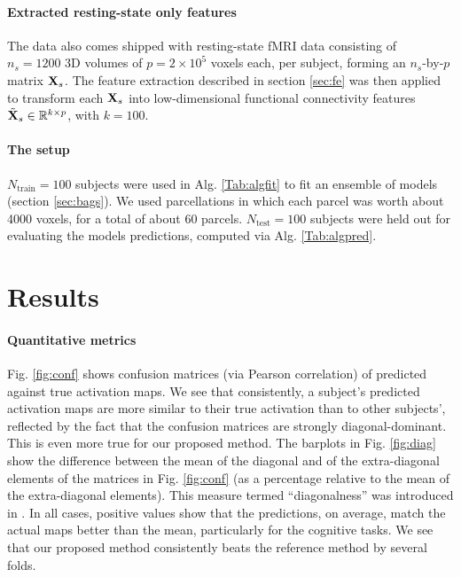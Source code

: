 \paragraph{Extracted resting-state only features}
The data also comes shipped with resting-state fMRI data consisting of $n_s = 1200$ 3D volumes
of $p = 2 \times 10^5$ voxels each, per subject, forming an $n_s$-by-$p$ matrix $\mathbf{X}_s$.
The feature extraction described in section \ref{sec:fe} was then applied to transform each $\mathbf{X}_s$
into low-dimensional functional connectivity features $\tilde{\mathbf{X}}_s \in \mathbb R^{k \times p}$, with $k=100$.
\paragraph{The setup}
$N_{\text{train}} = 100$ subjects were used in Alg. \ref{Tab:algfit} to fit an ensemble of models
(section \ref{sec:bags}). We used parcellations in which each parcel was worth about 4000 voxels,
for a total of about 60 parcels.
$N_{\text{test}} = 100$ subjects were held out for evaluating the models predictions,
computed via Alg. \ref{Tab:algpred}.

\section{Results}
\paragraph{Quantitative metrics} Fig. \ref{fig:conf} shows
confusion matrices (via Pearson correlation) of predicted against true activation maps. We see that consistently, a subject's predicted activation
maps are more similar to their true activation than to other subjects', reflected by the fact that the confusion matrices are strongly diagonal-dominant.
This is even more true for our proposed method. The barplots in Fig. \ref{fig:diag} show
the difference between the mean of the diagonal and of the extra-diagonal elements of the matrices in Fig. \ref{fig:conf}
(as a percentage relative to the mean of the extra-diagonal elements). This measure termed ``diagonalness'' was introduced in \citep{tavor2016task}.
In all cases, positive values show that the predictions, on average, match the
actual maps better than the mean, particularly for the cognitive tasks.
We see that our proposed method consistently beats the reference method \citep{tavor2016task} by several folds.

